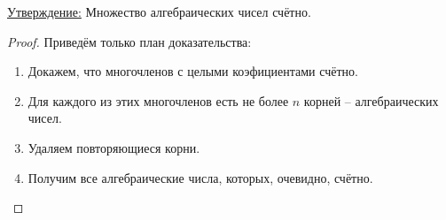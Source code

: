\documentclass[a4paper, 12pt]{article}
\newcommand{\statement}{\underline{Утверждение:} }
\begin{document}
\begin{enumerate}
          \statement Множество алгебраических чисел счётно.
          \begin{proof}
              Приведём только план доказательства:
              \begin{enumerate}
                      \item Докажем, что многочленов с целыми коэфициентами счётно.
                      \item Для каждого из этих многочленов есть не более $n$ корней --
                          алгебраических чисел.
                      \item Удаляем повторяющиеся корни.
                      \item Получим все алгебраические числа, которых, очевидно, 
                          счётно.
              \end{enumerate}
          \end{proof}
\end{enumerate}
\end{document}
